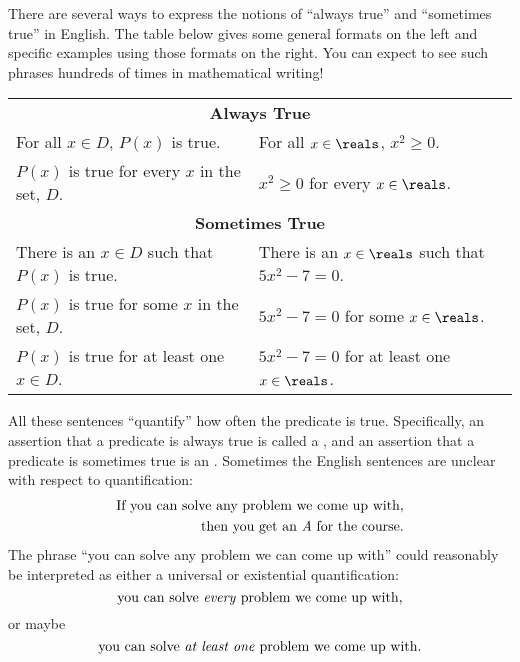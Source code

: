 There are several ways to express the notions of ``always true'' and
``sometimes true'' in English.  The table below gives some general
formats on the left and specific examples using those formats on the
right.  You can expect to see such phrases hundreds of times in
mathematical writing!
\begin{center}
\begin{tabular}{ll}
\multicolumn{2}{c}{\textbf{Always True}} \\[1ex]
For all $x \in D$, $P(x)$ is true. & For all $x \in \reals$, $x^2 \geq 0$. \\
$P(x)$ is true for every $x$ in the set, $D$. & $x^2 \geq 0$ for every $x \in \reals$. \\[2ex]
\multicolumn{2}{c}{\textbf{Sometimes True}} \\[1ex]
There is an $x \in D$ such that $P(x)$ is true. & There is an $x \in \reals$ such that $5x^2 - 7 = 0$.\\
$P(x)$ is true for some $x$ in the set, $D$. & $5x^2 - 7 = 0$ for some $x \in \reals$.\\
$P(x)$ is true for at least one $x \in D$. & $5x^2-7=0$ for at least one $x \in \reals$.
\end{tabular}
\end{center}

All these sentences ``quantify'' how often the predicate is true.
Specifically, an assertion that a predicate is always true is called a
, and an assertion that a predicate is
sometimes true is an .  Sometimes the
English sentences are unclear with respect to quantification:
\begin{align}
  \text{If you can solve any problem we come up with,}\notag\\
  \text{then you get an \emph{A} for the course.}\label{solvegetA}
\end{align}
%
The phrase ``you can solve any problem we can come up with'' could
reasonably be interpreted as either a universal or existential
quantification:
\begin{equation}\label{solve_every}
\text{you can solve \emph{every} problem we come up with,}
\end{equation}
or maybe
\begin{equation}\label{solve_atleastone}
\text{you can solve \emph{at least one} problem we come up with.}
\end{equation}

